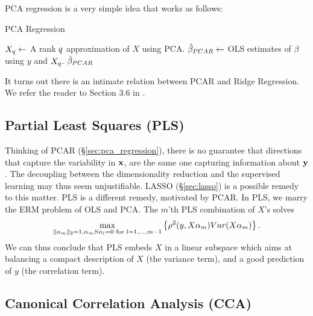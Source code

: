 PCA regression is a very simple idea that works as follows:
\begin{algorithm}[H]
\caption{PCA Regression}
\label{algo:pca_regression}
\begin{algorithmic}
\State $X_{q} \gets$ A rank $q$ approximation of $X$ using PCA.
\State $\hat{\beta}_{PCAR} \gets$ OLS estimates of $\beta$ using $y$ and $X_q$.
\State \Return $\hat{\beta}_{PCAR}$
\end{algorithmic}
\end{algorithm}



\begin{remark}
It turns out there is an intimate relation between PCAR and Ridge Regression.
We refer the reader to Section 3.6 in \cite{hastie_elements_2003}.
\end{remark}





\subsection{Partial Least Squares (PLS) }
\label{sec:pls}

Thinking of PCAR (\S\ref{sec:pca_regression}), there is no guarantee that directions that capture the variability in $\mathbf{x}$, are the same one capturing information about $\mathbf{y}$.
The decoupling between the dimensionality reduction and the supervised learning may thus seem unjustifiable. 
LASSO (\S\ref{sec:lasso}) is a possible remedy to this matter. 
PLS is a different remedy, motivated by PCAR.
In PLS, we marry the ERM problem of OLS and PCA.
The $m$'th PLS combination of $X$'s solves \citep[Eq.3.64]{hastie_elements_2003}
\begin{align}
\label{eq:pls}
	\max_{\Vert \alpha_m \Vert_2=1, \alpha_m S \alpha_l=0 \text{ for } l=1,\dots,m-1 } \left\{ \rho^2(y, X \alpha_m) Var(X \alpha_m)  \right\}.
\end{align}
We can thus conclude that PLS embeds $X$ in a linear subspace which aims at balancing a compact description of $X$ (the variance term), and a good prediction of $y$ (the correlation term).





\subsection{Canonical Correlation Analysis (CCA)}
\label{sec:cca}

